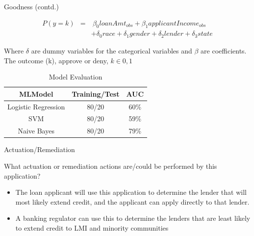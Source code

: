 \documentclass{beamer}
\begin{document}
\begin{frame}{Goodness (contd.)}

\begin{eqnarray*}
P(y=k) & = & \ \beta_0 loanAmt_{obs}  + \beta_1 applicantIncome_{obs} \\
& & + \delta_0 race  + \delta_1 gender +  \delta_2 lender  +  \delta_3 state
\end{eqnarray*}

Where $\delta$ are dummy variables for the categorical variables and $\beta$ are coefficients. The outcome (k), approve or deny, $k \in 0,1$

\begin{table}[]
\begin{tabular}{|c|c|c|}
\hline
\textbf{MLModel}    & \textbf{Training/Test} & \textbf{AUC} \\ \hline
Logistic Regression & 80/20                  & 60\%         \\ \hline
SVM                 & 80/20                  & 59\%         \\ \hline
Naive Bayes         & 80/20                  & 79\%         \\ \hline
\end{tabular}
\caption{Model Evaluation}
\label{tab:my-table}
\end{table}



\end{frame}

\begin{frame}{Actuation/Remediation}

What actuation or remediation actions are/could be performed by this application?  \vspace{3mm}

\begin{itemize}
  \item The loan applicant will use this application to determine the lender that will most likely extend credit, and the applicant can apply directly to that lender. 
  \item A banking regulator can use this to determine the lenders that are least likely to extend credit to LMI and minority communities 
\end{itemize}


\end{frame}
\end{document}

